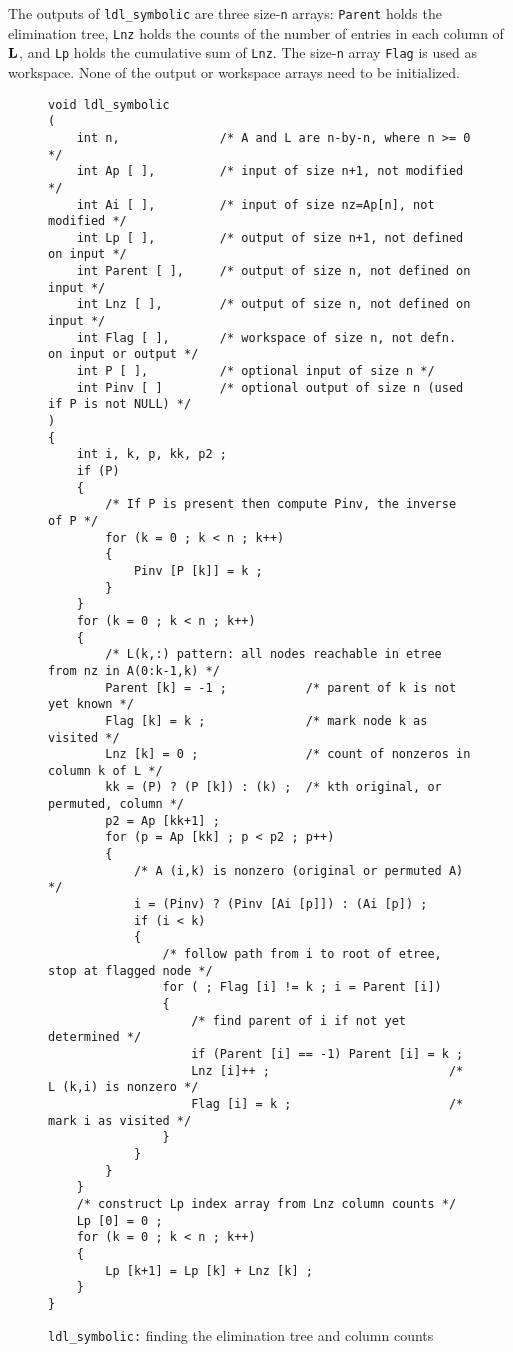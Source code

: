 \documentclass[12pt]{article}
\newcommand{\m}[1]{{\bf{#1}}}       %
\begin{document}
The outputs of {\tt ldl\_symbolic} are three size-{\tt n} arrays:
{\tt Parent} holds the elimination tree,
{\tt Lnz} holds the counts of the number of entries in each column of
$\m{L}$, and
{\tt Lp} holds the cumulative sum of {\tt Lnz}.
The size-{\tt n} array {\tt Flag} is used as workspace.
None of the output or workspace arrays need to be initialized.

\begin{figure}
\caption{{\tt ldl\_symbolic:} finding the elimination tree and column counts}
\label{ldlsymbolic}
{\scriptsize
\begin{verbatim}
void ldl_symbolic
(
    int n,              /* A and L are n-by-n, where n >= 0 */
    int Ap [ ],         /* input of size n+1, not modified */
    int Ai [ ],         /* input of size nz=Ap[n], not modified */
    int Lp [ ],         /* output of size n+1, not defined on input */
    int Parent [ ],     /* output of size n, not defined on input */
    int Lnz [ ],        /* output of size n, not defined on input */
    int Flag [ ],       /* workspace of size n, not defn. on input or output */
    int P [ ],          /* optional input of size n */
    int Pinv [ ]        /* optional output of size n (used if P is not NULL) */
)
{
    int i, k, p, kk, p2 ;
    if (P)
    {
        /* If P is present then compute Pinv, the inverse of P */
        for (k = 0 ; k < n ; k++)
        {
            Pinv [P [k]] = k ;
        }
    }
    for (k = 0 ; k < n ; k++)
    {
        /* L(k,:) pattern: all nodes reachable in etree from nz in A(0:k-1,k) */
        Parent [k] = -1 ;           /* parent of k is not yet known */
        Flag [k] = k ;              /* mark node k as visited */
        Lnz [k] = 0 ;               /* count of nonzeros in column k of L */
        kk = (P) ? (P [k]) : (k) ;  /* kth original, or permuted, column */
        p2 = Ap [kk+1] ;
        for (p = Ap [kk] ; p < p2 ; p++)
        {
            /* A (i,k) is nonzero (original or permuted A) */
            i = (Pinv) ? (Pinv [Ai [p]]) : (Ai [p]) ;
            if (i < k)
            {
                /* follow path from i to root of etree, stop at flagged node */
                for ( ; Flag [i] != k ; i = Parent [i])
                {
                    /* find parent of i if not yet determined */
                    if (Parent [i] == -1) Parent [i] = k ;
                    Lnz [i]++ ;                         /* L (k,i) is nonzero */
                    Flag [i] = k ;                      /* mark i as visited */
                }
            }
        }
    }
    /* construct Lp index array from Lnz column counts */
    Lp [0] = 0 ;
    for (k = 0 ; k < n ; k++)
    {
        Lp [k+1] = Lp [k] + Lnz [k] ;
    }
}
\end{verbatim}
}
\end{figure}
\end{document}
